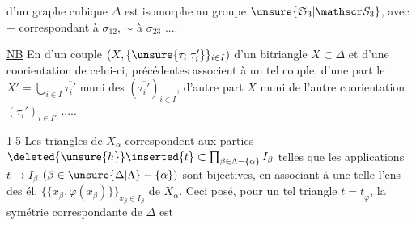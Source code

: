 d'un graphe cubique $\Delta$ est isomorphe au groupe $\unsure{\mathfrak S_3|\mathscr S_3}$, avec $-$ correspondant à $\sigma_{12}$, $\sim$ à $\sigma_{23}$ ....

\uline{NB} En  d'un couple $(X,\{\unsure{\tau_i|\tau_i'}\}_{i\in I})$ d'un bitriangle $X\subset\Delta$ et d'une coorientation de celui-ci,  précédentes associent à un tel couple, d'une part le
$X'=\bigcup_{i\in I}\overline{\tau_i'}$  muni des $(\overline{\tau_i'})_{i\in I}$, d'autre part $X$ muni de l'autre coorientation $(\tau_i')_{i\in I'}$ .....


\textcircled{15} Les triangles de $X_\alpha$ correspondent aux parties $\deleted{\unsure{h}} \inserted{t}\subset\prod_{\beta\in\Lambda-\{\alpha\}} I_\beta$  telles que les applications $t\longrightarrow I_\beta$ $(\beta\in\unsure{\Delta|\Lambda}-\{\alpha\})$  sont bijectives, en associant à une telle    l'ens des él. $\{\{x_\beta,\varphi(x_\beta)\}\}_{x_\beta\in I_\beta}$ de $X_\alpha$. Ceci posé, pour un tel triangle $\underline{t}=\underline{t}_\varphi$, la symétrie correspondante de $\Delta$ est


